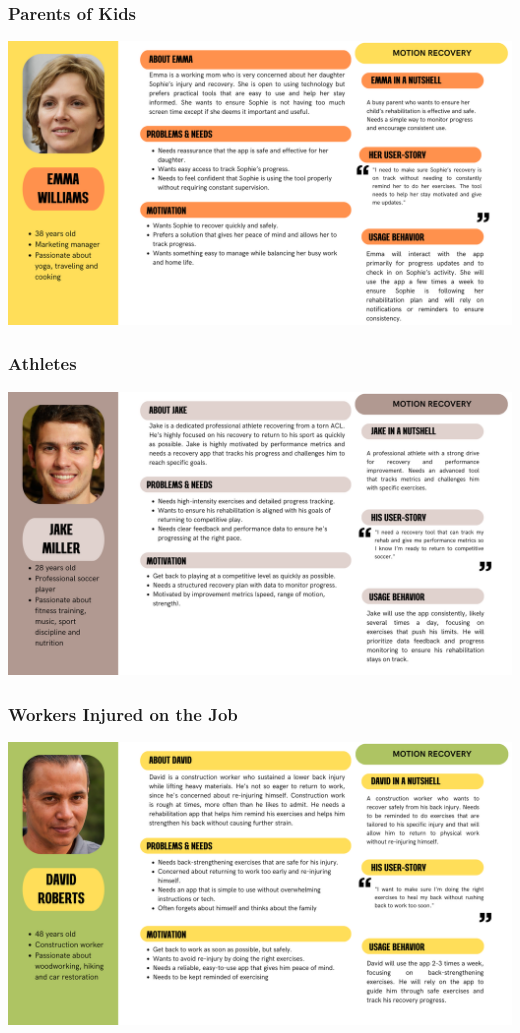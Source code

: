     \subsubsection{Parents of Kids}
    \includegraphics[width=\textwidth]{images/personas/patient_parent.png}
    \subsubsection{Athletes}
    \includegraphics[width=\textwidth]{images/personas/patient_athlete.png}
    \vfill
    \subsubsection{Workers Injured on the Job}
    \includegraphics[width=\textwidth]{images/personas/patient_worker_injured.png}
